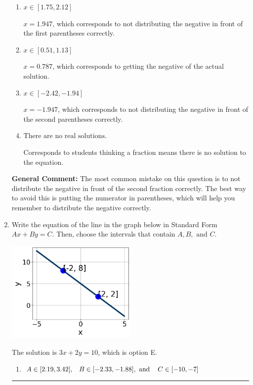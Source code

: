 \documentclass{extbook}[14pt]
\newcommand{\litem}[1]{\item #1

\rule{\textwidth}{0.4pt}}
\begin{document}
\begin{enumerate}
{\begin{enumerate}[label=\Alph*.]
* $x = -0.018$, which is the correct option.
\item \( x \in [1.75, 2.12] \)

$x = 1.947$, which corresponds to not distributing the negative in front of the first parentheses correctly.
\item \( x \in [0.51, 1.13] \)

$x = 0.787$, which corresponds to getting the negative of the actual solution.
\item \( x \in [-2.42, -1.94] \)

$x = -1.947$, which corresponds to not distributing the negative in front of the second parentheses correctly.
\item \( \text{There are no real solutions.} \)

Corresponds to students thinking a fraction means there is no solution to the equation.
\end{enumerate}

\textbf{General Comment:} The most common mistake on this question is to not distribute the negative in front of the second fraction correctly. The best way to avoid this is putting the numerator in parentheses, which will help you remember to distribute the negative correctly.
}
\litem{
Write the equation of the line in the graph below in Standard Form $Ax+By=C$. Then, choose the intervals that contain $A, B, \text{ and } C$.

\begin{center}
    \includegraphics[width=0.5\textwidth]{../Figures/linearGraphToStandardCopyC.png}
\end{center}


The solution is \( 3x + 2y = 10 \), which is option E.\begin{enumerate}[label=\Alph*.]
\item \( A \in [2.19, 3.42], \hspace{3mm} B \in [-2.33, -1.88], \text{ and } \hspace{3mm} C \in [-10, -7] \)


\end{enumerate}}
\end{enumerate}
\end{document}
